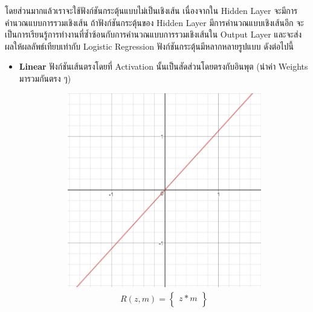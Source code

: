 โดยส่วนมากแล้วเราจะใช้ฟังก์ชันกระตุ้นแบบไม่เป็นเชิงเส้น เนื่องจากใน Hidden Layer จะมีการคำนวณแบบการรวมเชิงเส้น ถ้าฟังก์ชันกระตุ้นของ 
Hidden Layer มีการคำนวณแบบเชิงเส้นอีก จะเป็นการเรียนรู้การทำงานที่ซ้ำซ้อนกับการคำนวณแบบการรวมเชิงเส้นใน Output Layer 
และจะส่งผลให้ผลลัพธ์เทียบเท่ากับ Logistic Regression ฟังก์ชันกระตุ้นมีหลากหลายรูปแบบ ดังต่อไปนี้

\begin{itemize}
    \item \textbf{Linear} ฟังก์ชันเส้นตรงโดยที่ Activation นั้นเป็นสัดส่วนโดยตรงกับอินพุต (นำค่า Weights มารวมกันตรง ๆ)
    \begin{figure}[H]
        \centering
        \begin{subfigure}{0.5\textwidth}
            \centering
            \includegraphics[width=0.9\linewidth]{fig/actfunc_linear.png}
            \caption{%
                \begin{equation}
                    \begin{split}R(z,m) = \begin{Bmatrix} z*m \\
                    \end{Bmatrix}\end{split}
                \end{equation}
            }
            \label{fig:actfunc_lin}
        \end{subfigure}%
        \begin{subfigure}{0.5\textwidth}

\end{subfigure}
\end{figure}
\end{itemize}
